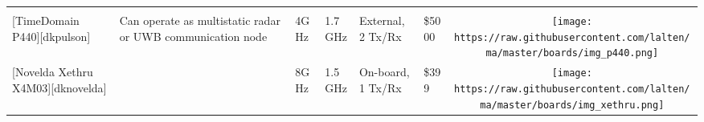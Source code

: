 \begin{longtable}[]{@{}llllllc@{}}
\begin{minipage}[t]{0.10\columnwidth}
\end{minipage}\tabularnewline
\begin{minipage}[t]{0.09\columnwidth}\raggedright\strut
{[}TimeDomain P440{]}{[}dkpulson{]}\strut
\end{minipage} & \begin{minipage}[t]{0.13\columnwidth}\raggedright\strut
Can operate as multistatic radar or UWB communication node\strut
\end{minipage} & \begin{minipage}[t]{0.09\columnwidth}\raggedright\strut
4GHz\strut
\end{minipage} & \begin{minipage}[t]{0.11\columnwidth}\raggedright\strut
1.7GHz\strut
\end{minipage} & \begin{minipage}[t]{0.10\columnwidth}\raggedright\strut
External, 2 Tx/Rx\strut
\end{minipage} & \begin{minipage}[t]{0.15\columnwidth}\raggedright\strut
\$5000\strut
\end{minipage} & \begin{minipage}[t]{0.10\columnwidth}\centering\strut
\texttt{[image: https://raw.githubusercontent.com/lalten/ma/master/boards/img\_p440.png]}\strut
\end{minipage}\tabularnewline
\begin{minipage}[t]{0.09\columnwidth}\raggedright\strut
{[}Novelda Xethru X4M03{]}{[}dknovelda{]}\strut
\end{minipage} & \begin{minipage}[t]{0.13\columnwidth}\raggedright\strut
\strut
\end{minipage} & \begin{minipage}[t]{0.09\columnwidth}\raggedright\strut
8GHz\strut
\end{minipage} & \begin{minipage}[t]{0.11\columnwidth}\raggedright\strut
1.5GHz\strut
\end{minipage} & \begin{minipage}[t]{0.10\columnwidth}\raggedright\strut
On-board, 1 Tx/Rx\strut
\end{minipage} & \begin{minipage}[t]{0.15\columnwidth}\raggedright\strut
\$399\strut
\end{minipage} & \begin{minipage}[t]{0.10\columnwidth}\centering\strut
\texttt{[image: https://raw.githubusercontent.com/lalten/ma/master/boards/img\_xethru.png]}\strut

\end{minipage}
\end{longtable}
